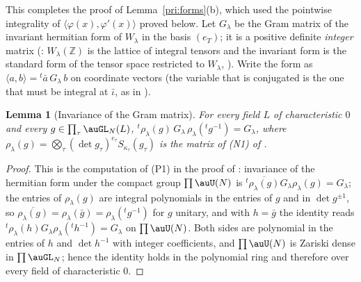 \documentclass[10pt]{amsart}
\newtheorem{lemma}[theorem]{Lemma}
\theoremstyle{definition}
\theoremstyle{remark}
\newcommand{\Z}{\mathbb Z}
\begin{document}
This completes the proof of Lemma~\ref{pri:forms}(b), which used the pointwise integrality of
$\langle\varphi(x),\varphi'(x)\rangle$ proved below. Let $G_\lambda$ be the Gram matrix of the invariant hermitian form of
$W_\lambda$ in the basis $(e_T)$; it is a positive definite \emph{integer} matrix
({\cite[\S5.2]{P53}}: $W_\lambda(\Z)$ is the lattice of integral tensors and the invariant form is the
standard form of the tensor space restricted to $W_\lambda$, {\cite[(38)]{P53}}). Write the form
as $\langle a,b\rangle={}^t\bar a\,G_\lambda\,b$ on coordinate vectors (the variable that is
conjugated is the one that must be integral at $\bar\iota$, as in {\cite[\S14.3]{P46}}).

\begin{lemma}[Invariance of the Gram matrix]\label{pax:gram}
For every field $L$ of characteristic $0$ and every $g\in\prod_\tau\auGL_N(L)$,
${}^t\rho_\lambda(g)\,G_\lambda\,\rho_\lambda({}^tg^{-1})=G_\lambda$, where $\rho_\lambda(g)=
\bigotimes_\tau(\det g_\tau)^{e_\tau}S_{\kappa_\tau}(g_\tau)$ is the matrix of (N1) of
{\cite[\S6.1]{P49}}.
\end{lemma}
\begin{proof}
This is the computation of (P1) in the proof of {\cite[Lemma~5.26]{P53}}: invariance of the hermitian
form under the compact group $\prod\auU(N)$ is ${}^t\overline{\rho_\lambda(g)}G_\lambda\rho_\lambda(g)=
G_\lambda$; the entries of $\rho_\lambda(g)$ are integral polynomials in the entries of $g$ and in
$\det g^{\pm1}$, so $\overline{\rho_\lambda(g)}=\rho_\lambda(\bar g)=\rho_\lambda({}^tg^{-1})$ for $g$
unitary, and with $h=\bar g$ the identity reads ${}^t\rho_\lambda(h)G_\lambda\rho_\lambda({}^th^{-1})=
G_\lambda$ on $\prod\auU(N)$. Both sides are polynomial in the entries of $h$ and $\det h^{-1}$ with
integer coefficients, and $\prod\auU(N)$ is Zariski dense in $\prod\auGL_N$; hence the identity holds
in the polynomial ring and therefore over every field of characteristic $0$.
\end{proof}
\end{document}
